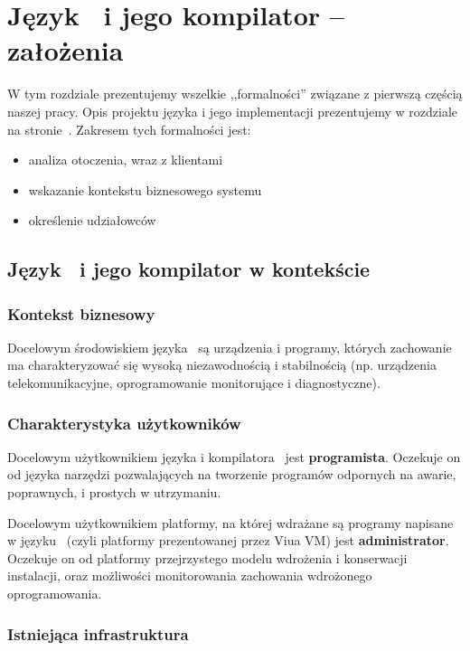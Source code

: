 \chapter{Język \ViuAct\ i jego kompilator -- założenia}
\label{viuact_zal}

W tym rozdziale prezentujemy wszelkie ,,formalności'' związane z pierwszą częścią naszej pracy.
Opis projektu języka i jego implementacji prezentujemy w rozdziale  na
stronie~\pageref{viuact_impl}. Zakresem tych formalności jest:

\begin{itemize}
    \item analiza otoczenia, wraz z klientami
    \item wskazanie kontekstu biznesowego systemu
    \item określenie udziałowców
\end{itemize}

\section{Język \ViuAct\ i jego kompilator w kontekście}

\subsection{Kontekst biznesowy}

Docelowym środowiskiem języka \ViuAct\ są urządzenia i programy, których
zachowanie ma charakteryzować się wysoką niezawodnością i stabilnością (np.
urządzenia telekomunikacyjne, oprogramowanie monitorujące i diagnostyczne).

\subsection{Charakterystyka użytkowników}

Docelowym użytkownikiem języka i kompilatora \ViuAct\ jest \textbf{programista}.
Oczekuje on od języka narzędzi pozwalających na tworzenie programów odpornych na awarie, poprawnych, i
prostych w utrzymaniu.

Docelowym użytkownikiem platformy, na której wdrażane są programy napisane w języku \ViuAct\ (czyli platformy
prezentowanej przez Viua VM) jest \textbf{administrator}. Oczekuje on od platformy przejrzystego modelu
wdrożenia i konserwacji instalacji, oraz możliwości monitorowania zachowania wdrożonego oprogramowania.

\subsection{Istniejąca infrastruktura}

